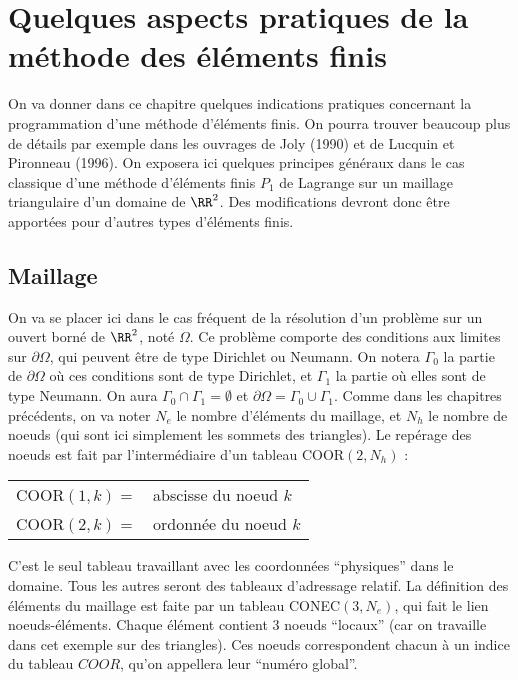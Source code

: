 \chapter{Quelques aspects pratiques de la m\'ethode des \'el\'ements finis}
%
\noindent
%
On va donner dans ce chapitre quelques indications pratiques concernant la
programmation d'une m\'ethode d'\'el\'ements finis. On  pourra trouver beaucoup
plus de d\'etails par exemple dans les ouvrages de Joly (1990) et de Lucquin et
Pironneau (1996).\saut
%
On exposera ici quelques principes g\'en\'eraux dans le cas classique d'une m\'ethode d'\'el\'ements finis $P_1$ de Lagrange sur un maillage triangulaire d'un domaine de $\RR^2$. Des modifications devront donc \^etre apport\'ees pour d'autres types d'\'el\'ements finis.
%
%
\section{Maillage}
\noindent
%
%
On va se placer ici dans le cas fr\'equent de la r\'esolution d'un probl\`eme sur un ouvert born\'e de $\RR^2$, not\'e $\Omega$. Ce probl\`eme comporte des conditions aux limites sur $\partial \Omega$, qui peuvent \^etre de type Dirichlet ou Neumann. On notera $\Gamma_0$ la partie de $\partial \Omega$ o\`u ces conditions sont de type Dirichlet, et $\Gamma_1$ la partie o\`u elles sont de type Neumann. On aura $\Gamma_0 \cap \Gamma_1=\emptyset$ et $\partial \Omega=\Gamma_0 \cup \Gamma_1$.\saut
%
%
Comme dans les chapitres pr\'ec\'edents, on va noter $N_e$ le nombre d'\'el\'ements du maillage, et $N_h$ le nombre de noeuds (qui sont ici simplement les sommets des triangles).\saut
%
Le rep\'erage des noeuds est fait par l'interm\'ediaire d'un tableau COOR$(2,N_h)$ :
\begin{center}
\begin{tabular}{ll}
 COOR$(1,k)=$ & abscisse du noeud $k$\\
 COOR$(2,k)=$ & ordonn\'ee du noeud $k$
\end{tabular}
\end{center}
%
C'est le seul tableau travaillant avec les coordonn\'ees ``physiques'' dans le domaine. Tous les autres seront des tableaux d'adressage relatif.\saut
%
La d\'efinition des \'el\'ements du maillage est faite par un tableau CONEC$(3,N_e)$, qui fait le lien noeuds-\'el\'ements. Chaque \'el\'ement contient 3 noeuds ``locaux'' (car on travaille dans cet exemple sur des triangles). Ces noeuds correspondent chacun \`a un indice du tableau $COOR$, qu'on appellera leur ``num\'ero global''.\\
